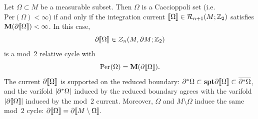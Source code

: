 \begin{proposition}\label{prop:cacc-cycle}
Let $\Omega \subset M$ be a measurable subset. Then $\Omega$ is a Caccioppoli set (i.e.\ $\mathrm{Per}(\Omega) < \infty$) if and only if the integration current $\llbracket \Omega \rrbracket \in \mathcal{R}_{n + 1}(M; \mathbb{Z}_2)$ satisfies $\mathbf{M}{(\partial\llbracket \Omega \rrbracket)} < \infty$. In this case,
\begin{equation*}
    \partial\llbracket \Omega \rrbracket \in \mathcal{Z}_n(M, \partial M;\mathbb{Z}_2)
\end{equation*}
is a mod~$2$ relative cycle with
\begin{equation*}
    \mathrm{Per}(\Omega) = \mathbf{M}{(\partial\llbracket \Omega \rrbracket)}.
\end{equation*}
The current $\partial\llbracket \Omega \rrbracket$ is supported on the reduced boundary: $\partial^*\Omega \subset \mathbf{spt}{\partial\llbracket \Omega \rrbracket}\subset\overline{\partial^*\Omega}$, and the varifold $\left| \partial^*\Omega \right|$ induced by the reduced boundary agrees with the varifold $\left| \partial\llbracket \Omega \rrbracket \right|$ induced by the mod~$2$ current. Moreover, $\Omega$ and $M\setminus \Omega$ induce the same mod~$2$ cycle: $\partial\llbracket \Omega \rrbracket = \partial\llbracket M\setminus \Omega \rrbracket$.
\end{proposition}
